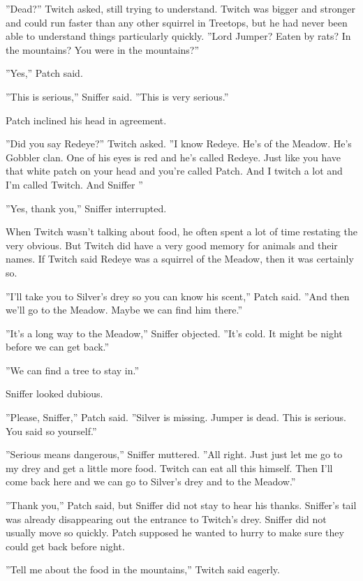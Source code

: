 \documentclass[12pt]{book}
\begin{document}
''Dead?'' Twitch asked, still trying to understand. Twitch was bigger and stronger and could run faster than any other squirrel in Treetops, but he had never been able to understand things particularly quickly. ''Lord Jumper? Eaten by rats? In the mountains? You were in the mountains?''\par
''Yes,'' Patch said.\par
''This is serious,'' Sniffer said. ''This is very serious.''\par
Patch inclined his head in agreement.\par
''Did you say Redeye?'' Twitch asked. ''I know Redeye. He's of the Meadow. He's Gobbler clan. One of his eyes is red and he's called Redeye. Just like you have that white patch on your head and you're called Patch. And I twitch a lot and I'm called Twitch. And Sniffer %
''\par
''Yes, thank you,'' Sniffer interrupted.\par
When Twitch wasn't talking about food, he often spent a lot of time restating the very obvious. But Twitch did have a very good memory for animals and their names. If Twitch said Redeye was a squirrel of the Meadow, then it was certainly so.\par
''I'll take you to Silver's drey so you can know his scent,'' Patch said. ''And then we'll go to the Meadow. Maybe we can find him there.''\par
''It's a long way to the Meadow,'' Sniffer objected. ''It's cold. It might be night before we can get back.''\par
''We can find a tree to stay in.''\par
Sniffer looked dubious.\par
''Please, Sniffer,'' Patch said. ''Silver is missing. Jumper is dead. This is serious. You said so yourself.''\par
''Serious means dangerous,'' Sniffer muttered. ''All right. Just %
 just let me go to my drey and get a little more food. Twitch can eat all this himself. Then I'll come back here and we can go to Silver's drey and to the Meadow.''\par
''Thank you,'' Patch said, but Sniffer did not stay to hear his thanks. Sniffer's tail was already disappearing out the entrance to Twitch's drey. Sniffer did not usually move so quickly. Patch supposed he wanted to hurry to make sure they could get back before night.\par
''Tell me about the food in the mountains,'' Twitch said eagerly.\par
\end{document}
